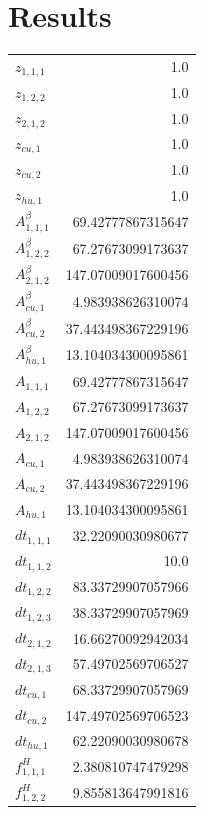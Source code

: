 \documentclass{article}%
\makeatletter
\let\mcnewpage=\newpage%
\newcommand{\TrickSupertabularIntoMulticols}{%
\renewcommand\newpage{%
\if@firstcolumn%
\hrule width\linewidth height0pt%
\columnbreak%
\else%
\mcnewpage%
\fi%
}%
}%
\makeatother
\begin{document}
\section{Results}%
\thispagestyle{plain}%
\begin{multicols*}{3}%
\TrickSupertabularIntoMulticols%
%
\begin{supertabular}{lr}%
	$z_{1,1,1}$ & 1.0 \\%
	$z_{1,2,2}$ & 1.0 \\%
	$z_{2,1,2}$ & 1.0 \\%
	$z_{cu,1}$ & 1.0 \\%
	$z_{cu,2}$ & 1.0 \\%
	$z_{hu,1}$ & 1.0 \\%
	$A_{1,1,1}^{\beta}$ & 69.42777867315647 \\%
	$A_{1,2,2}^{\beta}$ & 67.27673099173637 \\%
	$A_{2,1,2}^{\beta}$ & 147.07009017600456 \\%
	$A_{cu,1}^{\beta}$ & 4.983938626310074 \\%
	$A_{cu,2}^{\beta}$ & 37.443498367229196 \\%
	$A_{hu,1}^{\beta}$ & 13.104034300095861 \\%
	$A_{1,1,1}$ & 69.42777867315647 \\%
	$A_{1,2,2}$ & 67.27673099173637 \\%
	$A_{2,1,2}$ & 147.07009017600456 \\%
	$A_{cu,1}$ & 4.983938626310074 \\%
	$A_{cu,2}$ & 37.443498367229196 \\%
	$A_{hu,1}$ & 13.104034300095861 \\%
	$dt_{1,1,1}$ & 32.22090030980677 \\%
	$dt_{1,1,2}$ & 10.0 \\%
	$dt_{1,2,2}$ & 83.33729907057966 \\%
	$dt_{1,2,3}$ & 38.33729907057969 \\%
	$dt_{2,1,2}$ & 16.66270092942034 \\%
	$dt_{2,1,3}$ & 57.49702569706527 \\%
	$dt_{cu,1}$ & 68.33729907057969 \\%
	$dt_{cu,2}$ & 147.49702569706523 \\%
	$dt_{hu,1}$ & 62.22090030980678 \\%
	$f_{1,1,1}^{H}$ & 2.380810747479298 \\%
	$f_{1,2,2}^{H}$ & 9.855813647991816 \\%

\end{supertabular}
\end{multicols*}
\end{document}
